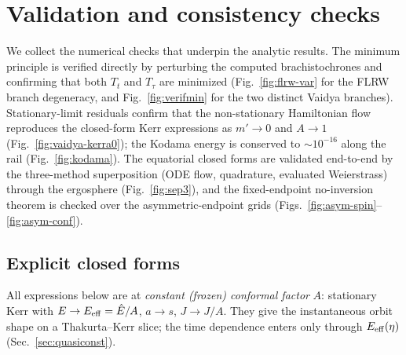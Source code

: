 \documentclass[
    aps, prd, twocolumn, superscriptaddress,
    showpacs, nofootinbib, floatfix
]{revtex4-2}
\newcommand{\Ehat}{\hat E}
\begin{document}
\section{Validation and consistency checks}
\label{app:validation}
We collect the numerical checks that underpin the analytic results. The
minimum principle is verified directly by perturbing the computed
brachistochrones and confirming that both $T_t$ and $T_\tau$ are minimized
(Fig.~\ref{fig:flrw-var} for the FLRW branch degeneracy, and
Fig.~\ref{fig:verifmin} for the two distinct Vaidya branches). Stationary-limit
residuals confirm that the non-stationary
Hamiltonian flow reproduces the closed-form Kerr expressions as $m'\to0$ and
$A\to1$ (Fig.~\ref{fig:vaidya-kerra0}); the Kodama energy is conserved to
$\sim10^{-16}$ along the rail (Fig.~\ref{fig:kodama}). The equatorial closed
forms are validated end-to-end by the three-method superposition
(ODE flow, quadrature, evaluated Weierstrass) through the ergosphere
(Fig.~\ref{fig:sep3}), and the fixed-endpoint no-inversion theorem is
checked over the asymmetric-endpoint grids (Figs.~\ref{fig:asym-spin}--%
\ref{fig:asym-conf}).

\subsection{Explicit closed forms}
\label{app:explicit}

All expressions below are at \emph{constant (frozen) conformal factor} $A$:
stationary Kerr with $E\to E_{\rm eff}=\Ehat/A$, $a\to s$, $J\to J/A$. They give
the instantaneous orbit shape on a Thakurta--Kerr slice; the time dependence
enters only through $E_{\rm eff}(\eta)$ (Sec.~\ref{sec:quasiconst}).
\end{document}
